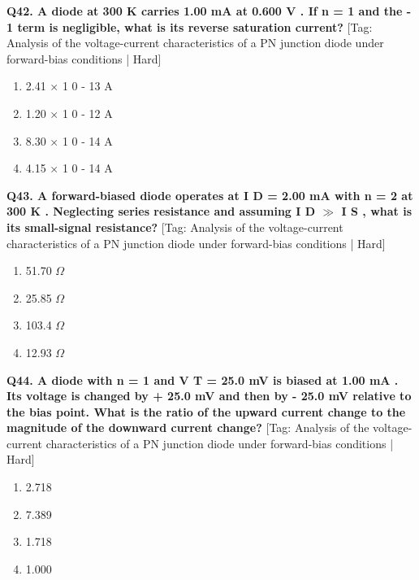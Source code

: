 \noindent\textbf{Q42. A diode at 300 K carries 1.00 mA at 0.600 V . If n = 1 and the - 1 term is negligible, what is its reverse saturation current?} \hfill [Tag: Analysis of the voltage-current characteristics of a PN junction diode under forward-bias conditions | Hard]
\begin{enumerate}[label=(\alph*),topsep=2pt,itemsep=1pt,partopsep=0pt,parsep=0pt]
    \item {2.41 $\times$ 1 0 - 13 A}
    \item {1.20 $\times$ 1 0 - 12 A}
    \item {8.30 $\times$ 1 0 - 14 A}
    \item {4.15 $\times$ 1 0 - 14 A}
\end{enumerate}
\vspace{2mm}

\noindent\textbf{Q43. A forward-biased diode operates at I D = 2.00 mA with n = 2 at 300 K . Neglecting series resistance and assuming I D $\gg$ I S , what is its small-signal resistance?} \hfill [Tag: Analysis of the voltage-current characteristics of a PN junction diode under forward-bias conditions | Hard]
\begin{enumerate}[label=(\alph*),topsep=2pt,itemsep=1pt,partopsep=0pt,parsep=0pt]
    \item {51.70 $\Omega$}
    \item {25.85 $\Omega$}
    \item {103.4 $\Omega$}
    \item {12.93 $\Omega$}
\end{enumerate}
\vspace{2mm}

\noindent\textbf{Q44. A diode with n = 1 and V T = 25.0 mV is biased at 1.00 mA . Its voltage is changed by + 25.0 mV and then by - 25.0 mV relative to the bias point. What is the ratio of the upward current change to the magnitude of the downward current change?} \hfill [Tag: Analysis of the voltage-current characteristics of a PN junction diode under forward-bias conditions | Hard]
\begin{enumerate}[label=(\alph*),topsep=2pt,itemsep=1pt,partopsep=0pt,parsep=0pt]
    \item {2.718}
    \item {7.389}
    \item {1.718}
    \item {1.000}
\end{enumerate}
\vspace{2mm}

